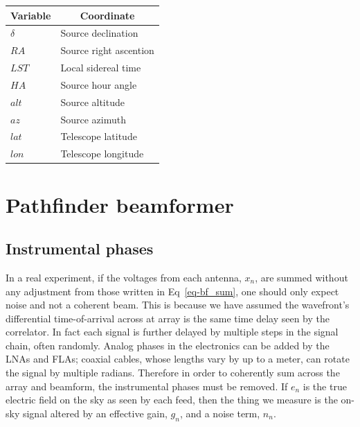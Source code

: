 \begin{table}[]
\centering
\label{tab-coord_var}
\begin{tabular}{ll}
\multicolumn{1}{c}{\textbf{Variable}} & \multicolumn{1}{c}{\textbf{Coordinate}} \\ \hline
$\delta$                              & Source declination                      \\
$RA$                                    & Source right ascention                  \\
$LST$                                   & Local sidereal time                     \\
$HA$                                    & Source hour angle                       \\
$alt$                                   & Source altitude                         \\
$az$                                    & Source azimuth                          \\
$lat$                                   & Telescope latitude                      \\
$lon$                                   & Telescope longitude                    
\end{tabular}
\end{table}

\section{Pathfinder beamformer}

\subsection{Instrumental phases}
\label{sec-instr_phases}
In a real experiment, if the voltages from each antenna, $x_n$, are summed 
without any adjustment from those written in Eq~\ref{eq-bf_sum}, one should only 
expect noise and not a coherent beam. This is because we have assumed 
the wavefront's differential time-of-arrival across at array 
is the same time delay seen by the correlator. In fact each 
signal is further delayed by multiple steps in the signal chain, 
often randomly. 
Analog phases in the electronics can be added by the LNAs and FLAs; 
coaxial cables, whose lengths vary by up to a meter, can rotate 
the signal by multiple radians. Therefore in order to coherently sum 
across the array and beamform, the instrumental phases must be removed. 
If $e_n$ is the true electric field on the 
sky as seen by each feed, then the thing we measure is the on-sky signal
altered by an effective gain, $g_n$, and a noise term, $n_n$.

